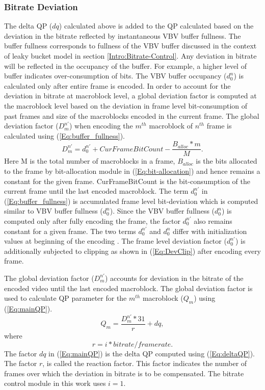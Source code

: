 \documentclass[11pt]{article} %
\begin{document}
\subsubsection{Bitrate Deviation} \label{sec: Bitrate overview: Bitrate deviation}
	The delta QP ($dq$) calculated above is added to the QP calculated based on the deviation in the bitrate reflected by instantaneous VBV buffer fullness. The buffer fullness corresponds to fullness of the VBV buffer discussed in the context of leaky bucket model in section \ref{Intro:Bitrate-Control}. Any deviation in bitrate will be reflected in the occupancy of the buffer. For example, a higher level of buffer indicates over-consumption of bits. The VBV buffer occupancy ($d_0^n$) is calculated only after entire frame is encoded. In order to account for the deviation in bitrate at macroblock level, a global deviation factor is computed at the macroblock level based on the deviation in frame level bit-consumption of past frames and size of the macroblocks encoded in the current frame. The global deviation factor ($D_m^{n'}$) when encoding the $m^{th}$ macroblock of $n^{th}$ frame is calculated using (\ref{Eq:buffer_fullness}).
\begin{equation}
	\label{Eq:buffer_fullness}
	D_m^{n'} = d_0^{n'} + CurFrameBitCount - \frac{B_{alloc} * m}{M}.
\end{equation}
Here M is the total number of macroblocks in a frame, $B_{alloc}$ is the bits allocated to the frame by bit-allocation module in (\ref{Eq:bit-allocation}) and hence remains a constant for the given frame. CurFrameBitCount is the bit-consumption of the current frame until the last encoded macroblock. The term $d_0^{n'}$ in (\ref{Eq:buffer_fullness}) is accumulated frame level bit-deviation which is computed similar to VBV buffer fullness ($d_0^n$). Since the VBV buffer fullness ($d_0^n$) is computed only after fully encoding the frame, the factor $d_0^{n'}$ also remains constant for a given frame. The two terms $d_0^{n'}$ and $d_0^n$ differ with initialization values at beginning of the encoding \cite{JVTF086}. The frame level deviation factor ($d_0^{n'}$) is additionally subjected to clipping as shown in (\ref{Eq:DevClip}) after encoding every frame. 

The global deviation factor ($D_m^{n'}$) accounts for deviation in the bitrate of the encoded video until the last encoded macroblock. The global deviation factor is used to calculate QP parameter for the $m^{th}$ macroblock ($Q_m$) using (\ref{Eq:mainQP}).
\begin{equation}
	\label{Eq:mainQP}
	Q_m = \frac{D_m^{n'} * 31}{r} + dq,
\end{equation}
where
\begin{equation}
 r = i * bitrate/framerate \nonumber.
\end{equation}
The factor $dq$ in (\ref{Eq:mainQP}) is the delta QP computed using (\ref{Eq:deltaQP}). The factor $r$, is called the reaction factor. This factor indicates the number of frames over which the deviation in bitrate is to be compensated. The bitrate control module in this work uses $i = 1$.
\end{document}
